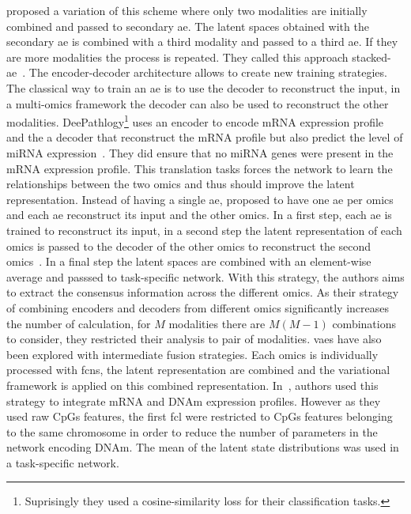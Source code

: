 \documentclass[../main.tex]{subfiles}
\begin{document}
		\citeauthor{Wu2022StackedAB} proposed a variation of this scheme where only two modalities are initially combined and passed to secondary \gls{ae}.
		The latent spaces obtained with the secondary \gls{ae} is combined with a third modality and passed to a third \gls{ae}.
		If they are more modalities the process is repeated.
		They called this approach stacked-\gls{ae}~\cite{Wu2022StackedAB}.
		The encoder-decoder architecture allows to create new training strategies.
		The classical way to train an \gls{ae} is to use the decoder to reconstruct the input, in a multi-omics framework the decoder can also be used to reconstruct the other modalities.
		DeePathlogy\footnote{Suprisingly they used a cosine-similarity loss for their classification tasks.} uses an encoder to encode mRNA expression profile and the a decoder that reconstruct the mRNA profile but also predict the level of miRNA expression~\cite{Azarkhalili2019}.
		They did ensure that no miRNA genes were present in the mRNA expression profile.
		This translation tasks forces the network to learn the relationships between the two omics and thus should improve the latent representation.
		Instead of having a single \gls{ae}, \citeauthor{CrossAE} proposed to have one \gls{ae} per omics and each \gls{ae} reconstruct its input and the other omics.
		In a first step, each \gls{ae} is trained to reconstruct its input, in a second step the latent representation of each omics is passed to the decoder of the other omics to reconstruct the second omics~\cite{CrossAE}.
		In a final step the latent spaces are combined with an element-wise average and passsed to task-specific network.
		With this strategy, the authors aims to extract the consensus information across the different omics.
		As their strategy of combining encoders and decoders from different omics significantly increases the number of calculation, for \(M\) modalities there are \(M(M-1)\) combinations to consider, they restricted their analysis to pair of modalities.
		\Glspl{vae} have also been explored with intermediate fusion strategies.
		Each omics is individually processed with \glspl{fcn}, the latent representation are combined and the variational framework is applied on this combined representation.
		In~\cite{Zhang2019}, authors used this strategy to integrate mRNA and DNAm expression profiles.
		However as they used raw CpGs features, the first \gls{fcl} were restricted to CpGs features belonging to the same chromosome in order to reduce the number of parameters in the network encoding DNAm.
		The mean of the latent state distributions was used in a task-specific network.
\end{document}
